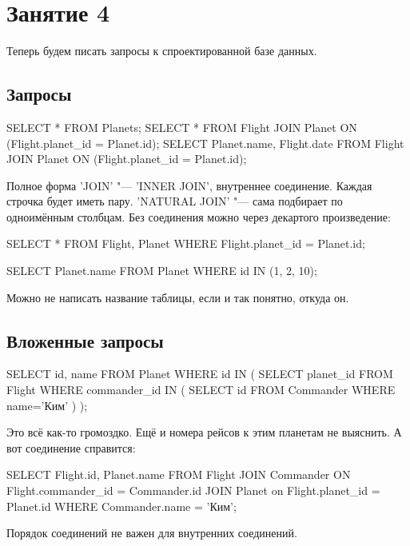 \chapter{Занятие 4}

Теперь будем писать запросы к спроектированной базе данных.

\section{Запросы}

\begin{sqlcode}
SELECT * FROM Planets;
SELECT *
	FROM Flight
		JOIN Planet ON (Flight.planet_id = Planet.id);
SELECT Planet.name, Flight.date 
	FROM Flight
		JOIN Planet ON (Flight.planet_id = Planet.id);
\end{sqlcode}
Полное форма \sql'JOIN' "--- \sql'INNER JOIN', внутреннее соединение.
Каждая строчка будет иметь пару.
\sql'NATURAL JOIN' "--- сама подбирает по одноимённым столбцам.
Без соединения можно через декартого произведение:
\begin{sqlcode}
SELECT *
	FROM Flight, Planet
	WHERE Flight.planet_id = Planet.id;

SELECT Planet.name
	FROM Planet
	WHERE id IN (1, 2, 10);
\end{sqlcode}
Можно не написать название таблицы, если и так понятно, откуда он.

\section{Вложенные запросы}
\begin{sqlcode}
SELECT id, name
	FROM Planet
	WHERE id IN (
		SELECT planet_id
			FROM Flight
			WHERE commander_id IN (
				SELECT id
					FROM Commander
					WHERE name='Ким'
			)
	);
\end{sqlcode}
Это всё как-то громоздко.
Ещё и номера рейсов к этим планетам не выяснить.
А вот соединение справится:
\begin{sqlcode}
SELECT Flight.id, Planet.name
	FROM Flight
		JOIN Commander ON Flight.commander_id = Commander.id
		JOIN Planet on Flight.planet_id = Planet.id
	WHERE
		Commander.name = 'Ким';
\end{sqlcode}
Порядок соединений не важен для внутренних соединений.

